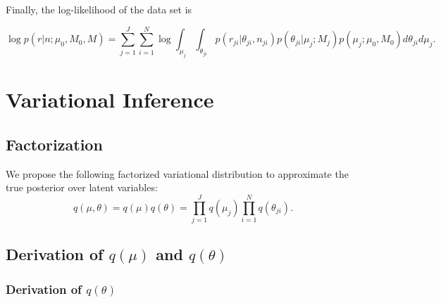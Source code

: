 \documentclass[11pt,reqno]{amsart}
\begin{document}
Finally, the log-likelihood of the data set is

\begin{equation}
\log p \left( r | n ; \mu_0, M_0, M \right) = \sum_{j=1}^J \sum_{i=1}^N \log \int_{\mu_j} \int_{\theta_{ji}}  p \left( r_{ji} | \theta_{ji}, n_{ji} \right) p\left( \theta_{ji} | \mu_j; M_j \right) p\left( \mu_j; \mu_0, M_0 \right) d\theta_{ji} d\mu_j.
\end{equation}



\section{Variational Inference}

\subsection{Factorization} 

We propose the following factorized variational distribution to approximate the true posterior over latent variables:
\begin{equation}
  q(\mu, \theta) = q(\mu)q(\theta) = \prod_{j=1}^J q(\mu_{j}) \prod_{i=1}^N q(\theta_{ji}).
  \label{eq:vardist}
\end{equation}


\subsection{Derivation of $ q(\mu) $ and $ q(\theta) $}

\subsubsection{Derivation of $ q(\theta) $}
\end{document}
